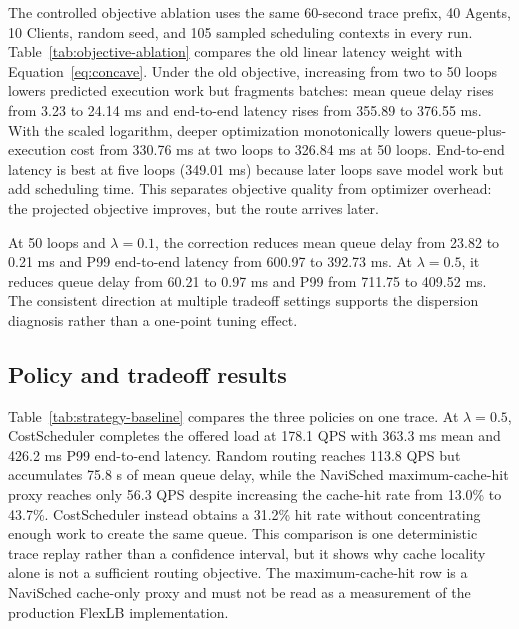\documentclass[10pt]{article}
\begin{document}
The controlled objective ablation uses the same 60-second trace prefix, 40
Agents, 10 Clients, random seed, and 105 sampled scheduling contexts in every
run. Table~\ref{tab:objective-ablation} compares the old linear latency weight
with Equation~\ref{eq:concave}. Under the old objective,
increasing from two to 50 loops lowers predicted execution work but fragments
batches: mean queue delay rises from 3.23 to 24.14 ms and end-to-end latency
rises from 355.89 to 376.55 ms. With the scaled logarithm, deeper optimization
monotonically lowers queue-plus-execution cost from 330.76 ms at two loops to
326.84 ms at 50 loops. End-to-end latency is best at five loops (349.01 ms)
because later loops save model work but add scheduling time. This separates
objective quality from optimizer overhead: the projected objective improves,
but the route arrives later.

At 50 loops and $\lambda=0.1$, the correction reduces mean queue delay from
23.82 to 0.21 ms and P99 end-to-end latency from 600.97 to 392.73 ms. At
$\lambda=0.5$, it reduces queue delay from 60.21 to 0.97 ms and P99 from
711.75 to 409.52 ms. The consistent direction at multiple tradeoff settings
supports the dispersion diagnosis rather than a one-point tuning effect.

\subsection{Policy and tradeoff results}

Table~\ref{tab:strategy-baseline} compares the three policies on one trace.
At $\lambda=0.5$, CostScheduler completes the offered load at 178.1 QPS
with 363.3 ms mean and 426.2 ms P99 end-to-end latency. Random routing
reaches 113.8 QPS but accumulates 75.8 s of mean queue delay, while the
NaviSched maximum-cache-hit proxy reaches only 56.3 QPS despite increasing
the cache-hit rate from 13.0\% to 43.7\%. CostScheduler instead obtains a
31.2\% hit rate
without concentrating enough work to create the same queue. This comparison
is one deterministic trace replay rather than a confidence interval, but it
shows why cache locality alone is not a sufficient routing objective.
The maximum-cache-hit row is a NaviSched cache-only proxy and must not be read
as a measurement of the production FlexLB implementation.
\end{document}
